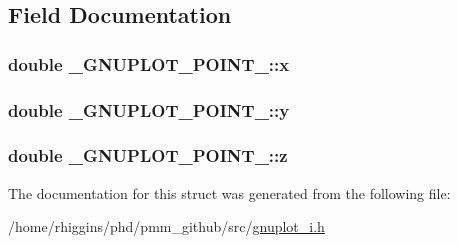 \subsection{Field Documentation}
\hypertarget{struct__GNUPLOT__POINT___a129dd22f6309cf8995ad29a6dbc0d06e}{
\subsubsection[{x}]{\setlength{\rightskip}{0pt plus 5cm}double \-\_\-\-G\-N\-U\-P\-L\-O\-T\-\_\-\-P\-O\-I\-N\-T\-\_\-\-::x}}\label{struct__GNUPLOT__POINT___a129dd22f6309cf8995ad29a6dbc0d06e}
\hypertarget{struct__GNUPLOT__POINT___adf97eda67c096181c0b7b4f80109b170}{
\subsubsection[{y}]{\setlength{\rightskip}{0pt plus 5cm}double \-\_\-\-G\-N\-U\-P\-L\-O\-T\-\_\-\-P\-O\-I\-N\-T\-\_\-\-::y}}\label{struct__GNUPLOT__POINT___adf97eda67c096181c0b7b4f80109b170}
\hypertarget{struct__GNUPLOT__POINT___a3e9a5edcd95894b58c9719b0eb2dae1e}{
\subsubsection[{z}]{\setlength{\rightskip}{0pt plus 5cm}double \-\_\-\-G\-N\-U\-P\-L\-O\-T\-\_\-\-P\-O\-I\-N\-T\-\_\-\-::z}}\label{struct__GNUPLOT__POINT___a3e9a5edcd95894b58c9719b0eb2dae1e}


The documentation for this struct was generated from the following file\-:\begin{DoxyCompactItemize}
\item 
/home/rhiggins/phd/pmm\-\_\-github/src/\hyperlink{gnuplot__i_8h}{gnuplot\-\_\-i.\-h}\end{DoxyCompactItemize}
